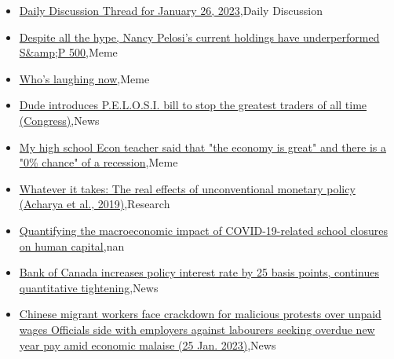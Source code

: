 \documentclass{article}%
\begin{document}
%
\begin{itemize}%
\item%
\href{https://reddit.com/r/wallstreetbets/comments/10lp9jb/daily\_discussion\_thread\_for\_january\_26\_2023/}{Daily Discussion Thread for January 26, 2023},Daily Discussion%
\item%
\href{https://reddit.com/r/wallstreetbets/comments/10lny91/despite\_all\_the\_hype\_nancy\_pelosis\_current/}{Despite all the hype, Nancy Pelosi's current holdings have underperformed S\&amp;P 500},Meme%
\item%
\href{https://reddit.com/r/wallstreetbets/comments/10ln890/whos\_laughing\_now/}{Who's laughing now},Meme%
\item%
\href{https://reddit.com/r/wallstreetbets/comments/10lkssw/dude\_introduces\_pelosi\_bill\_to\_stop\_the\_greatest/}{Dude introduces P.E.L.O.S.I. bill to stop the greatest traders of all time (Congress)},News%
\item%
\href{https://reddit.com/r/wallstreetbets/comments/10lkhnp/my\_high\_school\_econ\_teacher\_said\_that\_the\_economy/}{My high school Econ teacher said that "the economy is great" and there is a "0\% chance" of a recession},Meme%
\item%
\href{https://reddit.com/r/Economics/comments/10l9ahw/whatever\_it\_takes\_the\_real\_effects\_of/}{Whatever it takes: The real effects of unconventional monetary policy (Acharya et al., 2019)},Research%
\item%
\href{https://reddit.com/r/Economics/comments/10l59p9/quantifying\_the\_macroeconomic\_impact\_of/}{Quantifying the macroeconomic impact of COVID-19-related school closures on human capital},nan%
\item%
\href{https://reddit.com/r/Economics/comments/10l11rk/bank\_of\_canada\_increases\_policy\_interest\_rate\_by/}{Bank of Canada increases policy interest rate by 25 basis points, continues quantitative tightening},News%
\item%
\href{https://reddit.com/r/Economics/comments/10kpe17/chinese\_migrant\_workers\_face\_crackdown\_for/}{Chinese migrant workers face crackdown for malicious protests over unpaid wages  Officials side with employers against labourers seeking overdue new year pay amid economic malaise (25 Jan. 2023)},News%
\end{itemize}%
\end{document}
